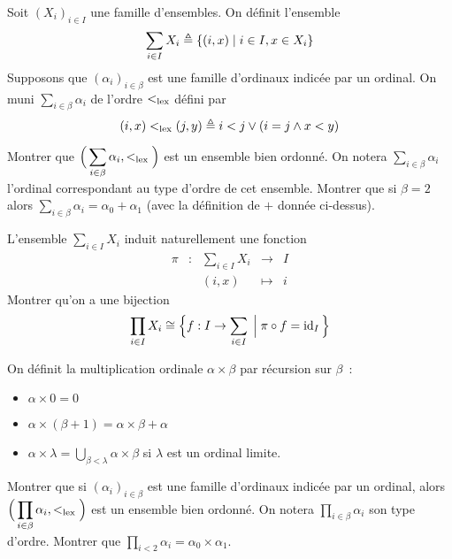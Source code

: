 \begin{exercise}
  Soit $(X_i)_{i\in I}$ une famille d'ensembles. On définit l'ensemble
  \[\sum_{i\in I} X_i \triangleq \{(i,x)\mid i\in I, x \in X_i\}\]
  Supposons que $(\alpha_i)_{i\in \beta}$ est une famille d'ordinaux indicée par
  un ordinal. On muni $\sum_{i\in\beta} \alpha_i$ de l'ordre $<_{\mathrm{lex}}$ défini par
  \[(i,x)<_{\mathrm{lex}} (j,y) \triangleq i < j \lor (i = j \land x < y)\]

  Montrer que $\displaystyle\Big(\sum_{i\in \beta}\alpha_i,<_{\mathrm{lex}}\Big)$ est un
  ensemble bien ordonné. On notera $\displaystyle\sum_{i\in\beta}\alpha_i$
  l'ordinal correspondant au type d'ordre de cet ensemble. Montrer que si
  $\beta = 2$ alors $\displaystyle\sum_{i\in\beta}\alpha_i = \alpha_0 + \alpha_1$
  (avec la définition de $+$ donnée ci-dessus).
\end{exercise}

\begin{exercise}
  L'ensemble $\sum_{i\in I} X_i$ induit naturellement une fonction
  \[\begin{array}{ccccc}
  \pi & : & \sum_{i\in I} X_i & \longrightarrow & I\\
  & & (i,x) & \longmapsto & i
  \end{array}\]
  Montrer qu'on a une bijection
  \[\prod_{i \in I} X_i \cong \Big\{f : I \to \sum_{i \in I}\;\Big|\;
  \pi\circ f = \operatorname{id}_I\Big\}\]
\end{exercise}

\begin{definition}
  On définit la multiplication ordinale $\alpha\times \beta$ par récursion sur
  $\beta$~:
  \begin{itemize}
  \item $\alpha \times 0 = 0$
  \item $\alpha \times (\beta + 1) = \alpha \times \beta + \alpha$
  \item $\displaystyle \alpha \times \lambda = \bigcup_{\beta < \lambda} \alpha
    \times \beta$ si $\lambda$ est un ordinal limite.
  \end{itemize}
\end{definition}

\begin{exercise}
  Montrer que si $(\alpha_i)_{i\in \beta}$ est une famille d'ordinaux indicée par
  un ordinal, alors $\displaystyle\Big(\prod_{i\in \beta}\alpha_i,<_{\mathrm{lex}}\Big)$
  est un ensemble bien ordonné. On notera $\prod_{i\in\beta}\alpha_i$ son type
  d'ordre. Montrer que
  $\displaystyle\prod_{i < 2}\alpha_i = \alpha_0\times\alpha_1$.
\end{exercise}

